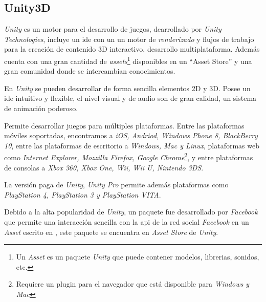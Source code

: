 \subsection{Unity3D}

\textit{Unity}\cite{unity3d} es un motor para el desarrollo de juegos,
dearrollado por \textit{Unity Technologies}, incluye un \Gls{ide} con un un
motor de \textit{renderizado} y flujos de trabajo para la creación de contenido
3D interactivo, desarrollo multiplataforma. Además cuenta con una gran cantidad
de \textit{assets}\footnote{Un \textit{Asset} es un paquete \textit{Unity} que
    puede contener modelos, librerias, sonidos, etc.} disponibles en un
\enquote{Asset Store} y una gran comunidad donde se intercambian conocimientos.

En \textit{Unity} se pueden desarrollar de forma sencilla elementos 2D y 3D.
Posee un \Gls{ide} intuitivo y flexible, el nivel visual y de audio son de gran
calidad, un sistema de animación poderoso. 

Permite desarrollar juegos para múltiples plataformas. Entre las plataformas
móviles soportadas, encontramos a \textit{iOS, Andriod, Windows Phone 8,
    BlackBerry 10}, entre las plataformas de escritorio a \textit{Windows, Mac y
    Linux}, plataformas web como \textit{Internet Explorer, Mozzilla Firefox,
    Google Chrome}\footnote{Requiere un plugin para el navegador que está
    disponible para \textit{Windows y Mac}}, y entre plataformas de consolas a
\textit{Xbox 360, Xbox One, Wii, Wii U, Nintendo 3DS}.

La versión paga de \textit{Unity}, \textit{Unity Pro} permite además plataformas
como \textit{PlayStation 4, PlayStation 3 y PlayStation VITA}.

Debido a la alta popularidad de \textit{Unity}, un paquete fue desarrollado por
\textit{Facebook} que permite una interacción sencilla con la \Gls{api} de la
red social \textit{Facebook} en un \textit{Asset} escrito en \cs{}, este paquete
se encuentra en \textit{Asset Store} de \textit{Unity}.
